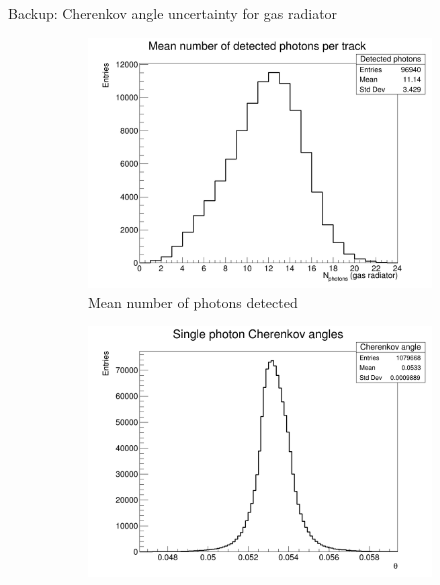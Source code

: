 \documentclass{beamer}
\begin{document}
\begin{frame}{Backup: Cherenkov angle uncertainty for gas radiator}
  \begin{figure}
    \centering
    \vspace{-0.2cm}
    \begin{subfigure}{0.35\textwidth}
      \includegraphics[width = 1.0\textwidth]{Plots/NumberDetectedPhotons_Barrel_Gas.png}
      \vspace{-0.75cm}
      \caption{Mean number of photons detected}
    \end{subfigure}
    \begin{subfigure}{0.35\textwidth}
      \includegraphics[width = 1.0\textwidth]{Plots/SinglePhotonCherenkovAngles_Barrel_Gas.png}
      \vspace{-0.75cm}

\end{subfigure}
\end{figure}
\end{frame}
\end{document}
